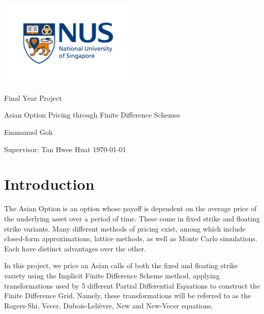 \documentclass{article}
\begin{document}
\begin{titlepage}
  \centering
  \includegraphics[width=0.5\textwidth]{nus}

  \LARGE Final Year Project

  \vspace{1cm}
  \Large Asian Option Pricing through Finite Difference Schemes

  \vspace{1cm}

  \Large Emmanuel Goh

  \vspace{1cm}
  \Large Supervisor: Tan Hwee Huat
  \vfill
  \large \today
\end{titlepage}

\tableofcontents

\newpage

\section{Introduction}

The Asian Option is an option whose payoff is dependent on the average price of the underlying asset over a period of time. These come in fixed strike and floating strike variants. Many different methods of pricing exist, among which include closed-form approximations, lattice methods, as well as Monte Carlo simulations. Each have distinct advantages over the other.

In this project, we price an Asian calls of both the fixed and floating strike variety using the Implicit Finite Difference Scheme method, applying transformations used by 5 different Partial Differential Equations to construct the Finite Difference Grid. Namely, these transformations will be referred to as the Rogers-Shi, Vecer, Dubois-Leli\`evre, New and New-Vecer equations.
\end{document}
